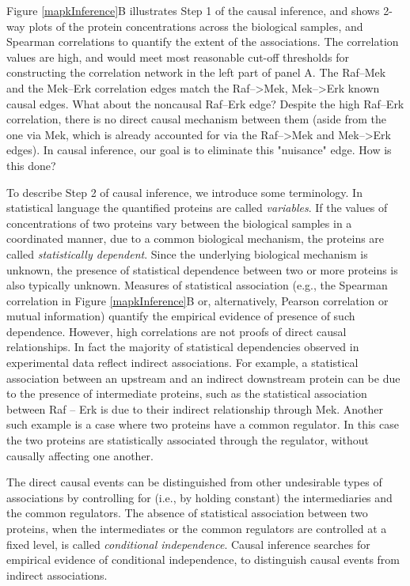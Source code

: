 \documentclass[journal=jacsat,manuscript=article]{achemso}
\begin{document}
Figure \ref{mapkInference}B illustrates Step 1 of the causal inference, and shows 2-way plots of the protein concentrations across the biological samples, and Spearman correlations to quantify the extent of the associations.  The correlation values are high, and would meet most reasonable cut-off thresholds for constructing the correlation network in the left part of panel A.  The Raf--Mek and the Mek--Erk correlation edges match the Raf-->Mek, Mek-->Erk known causal edges.  What about the noncausal Raf--Erk edge? Despite the high Raf--Erk correlation, there is no direct causal mechanism between them (aside from the one via Mek, which is already accounted for via the Raf-->Mek and Mek-->Erk edges).  In causal  inference, our goal is to eliminate this "nuisance" edge.  How is this done?

To describe Step 2 of causal inference, we introduce some terminology. In statistical language the quantified proteins are called {\it variables}. If the values of concentrations of two proteins vary between the biological samples in a coordinated manner, due to a common biological mechanism, the proteins are called {\it statistically dependent}.  Since the underlying biological mechanism is unknown, the presence of statistical dependence between two or more proteins is also typically unknown. Measures of statistical association (e.g.,  the Spearman correlation in Figure \ref{mapkInference}B or, alternatively, Pearson correlation or mutual information) quantify the empirical evidence of presence of such dependence. However, high correlations are not proofs of direct causal relationships. In fact the majority of statistical dependencies observed in experimental data reflect indirect associations. For example, a statistical association between an upstream and an indirect downstream protein can be due to the presence of intermediate proteins, such as the statistical association between Raf -- Erk is due to their indirect relationship through Mek. Another such example is a case where two proteins have a common regulator. In this case the two proteins are statistically associated through the regulator, without causally affecting one another. 

The direct causal events can be distinguished from other undesirable types of associations by controlling for (i.e., by holding constant) the intermediaries and the common regulators. The absence of statistical association between two proteins, when the intermediates or the common regulators are controlled at a fixed level, is called {\it conditional independence}.  Causal inference searches for empirical evidence of conditional independence, to distinguish causal events from indirect associations. 
\end{document}
